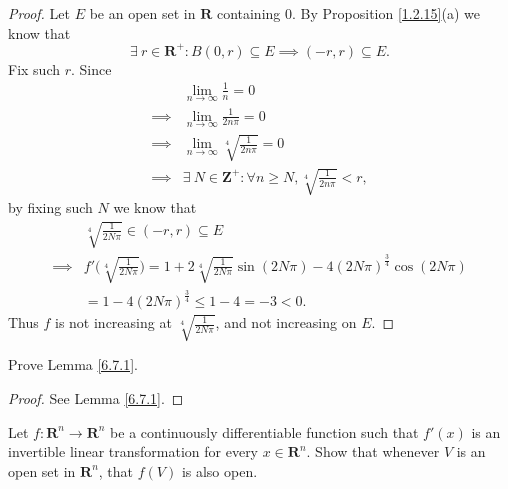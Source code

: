 \begin{proof}
    Let \(E\) be an open set in \(\mathbf{R}\) containing \(0\).
    By Proposition \ref{1.2.15}(a) we know that
    \[
        \exists\ r \in \mathbf{R}^+ : B(0, r) \subseteq E \implies (-r, r) \subseteq E.
    \]
    Fix such \(r\).
    Since
    \begin{align*}
                 & \lim_{n \to \infty} \frac{1}{n} = 0                                              \\
        \implies & \lim_{n \to \infty} \frac{1}{2 n \pi} = 0                                        \\
        \implies & \lim_{n \to \infty} \sqrt[4]{\frac{1}{2 n \pi}} = 0                              \\
        \implies & \exists\ N \in \mathbf{Z}^+ : \forall n \geq N, \sqrt[4]{\frac{1}{2 n \pi}} < r,
    \end{align*}
    by fixing such \(N\) we know that
    \begin{align*}
                 & \sqrt[4]{\frac{1}{2 N \pi}} \in (-r, r) \subseteq E                                                                                   \\
        \implies & f'\bigg(\sqrt[4]{\frac{1}{2 N \pi}}\bigg) = 1 + 2 \sqrt[4]{\frac{1}{2 N \pi}} \sin(2 N \pi) - 4 (2 N \pi)^{\frac{3}{4}} \cos(2 N \pi) \\
                 & = 1 - 4 (2 N \pi)^{\frac{3}{4}} \leq 1 - 4 = -3 < 0.
    \end{align*}
    Thus \(f\) is not increasing at \(\sqrt[4]{\frac{1}{2 N \pi}}\), and not increasing on \(E\).
\end{proof}

\begin{exercise}\label{ex 6.7.2}
    Prove Lemma \ref{6.7.1}.
\end{exercise}

\begin{proof}
    See Lemma \ref{6.7.1}.
\end{proof}

\begin{exercise}\label{ex 6.7.3}
    Let \(f : \mathbf{R}^n \to \mathbf{R}^n\) be a continuously differentiable function such that \(f'(x)\) is an invertible linear transformation for every \(x \in \mathbf{R}^n\).
    Show that whenever \(V\) is an open set in \(\mathbf{R}^n\), that \(f(V)\) is also open.
\end{exercise}

